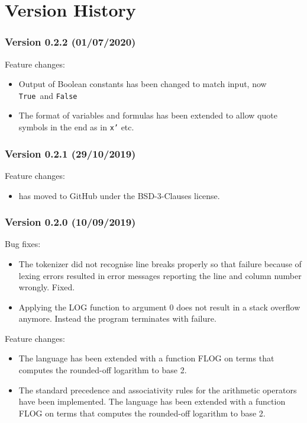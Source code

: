\documentclass[twoside]{article}
\begin{document}
\section{Version History}


\subsubsection*{Version 0.2.2 (01/07/2020)}

Feature changes:
\begin{itemize}
\item Output of Boolean constants has been changed to match input, now \texttt{True} and \texttt{False}
\item The format of variables and formulas has been extended to allow quote symbols in the end as in \texttt{x'} etc.
\end{itemize}

\subsubsection*{Version 0.2.1 (29/10/2019)}

Feature changes:
\begin{itemize}
\item \DiMo has moved to GitHub under the BSD-3-Clauses license.
\end{itemize}


\subsubsection*{Version 0.2.0 (10/09/2019)}

Bug fixes:
\begin{itemize}
\item The tokenizer did not recognise line breaks properly so that failure because of lexing errors resulted in error messages reporting the line and column number wrongly. Fixed.
\item Applying the LOG function to argument 0 does not result in a stack overflow anymore. Instead the program terminates with failure. 
\end{itemize}
Feature changes:
\begin{itemize}
\item The \DiMo language has been extended with a function FLOG on terms that computes the rounded-off logarithm to base 2.
\item The standard precedence and associativity rules for the arithmetic operators have been implemented. The \DiMo language has been extended with a function FLOG on terms that computes the rounded-off logarithm to base 2.
\end{itemize}
\end{document}
